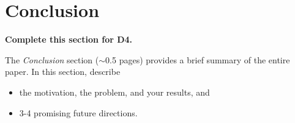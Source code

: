\documentclass[letterpaper]{article} %
\begin{document}

\section{Conclusion}

{\bf Complete this section for D4.}

The {\it Conclusion} section ($\sim$0.5 pages) provides a brief summary of the entire paper.  In this section, describe 
\begin{itemize}
    \item the motivation, the problem, and your results, and
    \item 3-4 promising future directions.
\end{itemize}

\newpage


\end{document}
